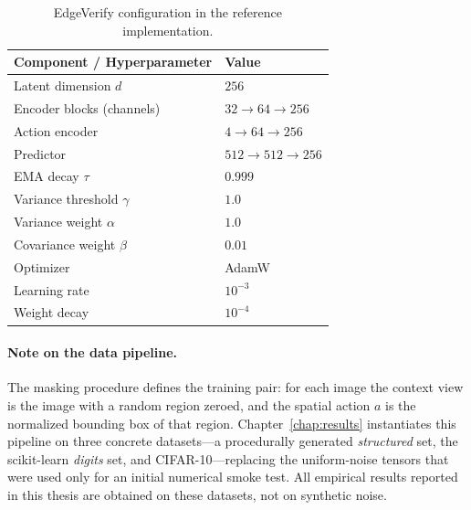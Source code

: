 \begin{table}[htbp]
    \centering
    \caption{EdgeVerify configuration in the reference implementation.}
    \label{tab:hparams}
    \begin{tabular}{ll}
        \toprule
        \textbf{Component / Hyperparameter} & \textbf{Value} \\
        \midrule
        Latent dimension $d$ & $256$ \\
        Encoder blocks (channels) & $32 \rightarrow 64 \rightarrow 256$ \\
        Action encoder & $4 \rightarrow 64 \rightarrow 256$ \\
        Predictor & $512 \rightarrow 512 \rightarrow 256$ \\
        EMA decay $\tau$ & $0.999$ \\
        Variance threshold $\gamma$ & $1.0$ \\
        Variance weight $\alpha$ & $1.0$ \\
        Covariance weight $\beta$ & $0.01$ \\
        Optimizer & AdamW \\
        Learning rate & $10^{-3}$ \\
        Weight decay & $10^{-4}$ \\
        \bottomrule
    \end{tabular}
\end{table}

\paragraph{Note on the data pipeline.}
The masking procedure defines the training pair: for each image the context
view is the image with a random region zeroed, and the spatial action $a$ is
the normalized bounding box of that region.
Chapter~\ref{chap:results} instantiates this pipeline on three concrete
datasets---a procedurally generated \emph{structured} set, the scikit-learn
\emph{digits} set, and CIFAR-10---replacing the uniform-noise tensors that were
used only for an initial numerical smoke test. All empirical results reported
in this thesis are obtained on these datasets, not on synthetic noise.
